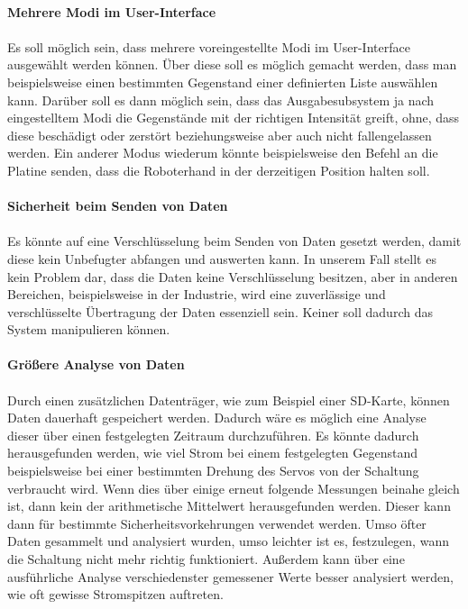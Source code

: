 \documentclass[titlepage,12pt,twoside]{article}
\begin{document}
\\
\textbf{Mehrere Modi im User-Interface} \\
\\
Es soll möglich sein, dass mehrere voreingestellte Modi im User-Interface ausgewählt werden können. 
Über diese soll es möglich gemacht werden, dass man beispielsweise einen bestimmten Gegenstand 
einer definierten Liste auswählen kann. Darüber soll es dann möglich sein, dass das Ausgabesubsystem 
ja nach eingestelltem Modi die Gegenstände mit der richtigen Intensität greift, ohne, dass diese 
beschädigt oder zerstört beziehungsweise aber auch nicht fallengelassen werden. Ein anderer Modus 
wiederum könnte beispielsweise den Befehl an die Platine senden, dass die Roboterhand in der 
derzeitigen Position halten soll. \\
\\
\newpage
\textbf{Sicherheit beim Senden von Daten} \\
\\
Es könnte auf eine Verschlüsselung beim Senden von Daten gesetzt werden, damit diese kein 
Unbefugter abfangen und auswerten kann. In unserem Fall stellt es kein Problem dar, dass die 
Daten keine Verschlüsselung besitzen, aber in anderen Bereichen, beispielsweise in der Industrie, 
wird eine zuverlässige und verschlüsselte Übertragung der Daten essenziell sein. Keiner soll 
dadurch das System manipulieren können. \\
\\
\textbf{Größere Analyse von Daten} \\
\\
Durch einen zusätzlichen Datenträger, wie zum Beispiel einer SD-Karte, können Daten dauerhaft 
gespeichert werden. Dadurch wäre es möglich eine Analyse dieser über einen festgelegten Zeitraum 
durchzuführen. Es könnte dadurch herausgefunden werden, wie viel Strom bei einem festgelegten 
Gegenstand beispielsweise bei einer bestimmten Drehung des Servos von der Schaltung verbraucht 
wird. Wenn dies über einige erneut folgende Messungen beinahe gleich ist, dann kein der 
arithmetische Mittelwert herausgefunden werden. Dieser kann dann für bestimmte 
Sicherheitsvorkehrungen verwendet werden. Umso öfter Daten gesammelt und analysiert wurden, umso 
leichter ist es, festzulegen, wann die Schaltung nicht mehr richtig funktioniert. Außerdem kann 
über eine ausführliche Analyse verschiedenster gemessener Werte besser analysiert werden, wie oft 
gewisse Stromspitzen auftreten. \\
\\
\end{document}
